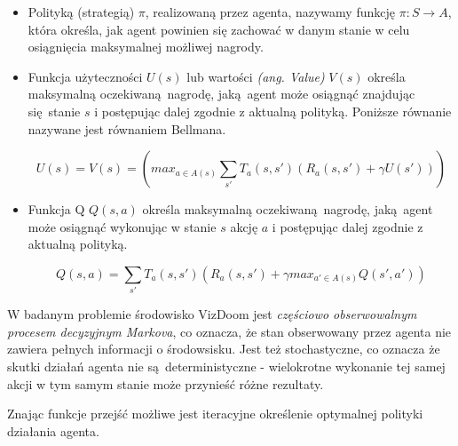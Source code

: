 \begin{itemize}
\item Polityką (strategią) $\pi$, realizowaną przez agenta, nazywamy funkcję $ \pi: S \rightarrow A$, która określa, jak agent powinien się zachować w danym stanie w celu osiągnięcia maksymalnej możliwej nagrody.
\item Funkcja użyteczności $U(s)$ lub wartości \textit{(ang. Value)} $V(s)$ określa maksymalną oczekiwaną nagrodę, jaką agent może osiągnąć znajdując się stanie $s$ i postępując dalej zgodnie z aktualną polityką. Poniższe równanie nazywane jest równaniem Bellmana.

$$U(s) = V(s) = (max_{a \in A(s)} \sum_{s'} T_a(s,s')(R_a(s,s') + \gamma U(s')))$$
\item Funkcja Q $Q(s,a)$ określa maksymalną oczekiwaną nagrodę, jaką agent może osiągnąć wykonując w stanie $s$ akcję $a$ i postępując dalej zgodnie z aktualną polityką.

$$Q(s,a) = \sum_{s'} T_a(s,s')(R_a(s,s') + \gamma max_{a' \in A(s)}Q(s',a'))$$

\end{itemize}

\vspace{5mm}

W badanym problemie środowisko VizDoom jest \textit{częściowo obserwowalnym procesem decyzyjnym Markova}, co oznacza, że stan obserwowany przez agenta nie zawiera pełnych informacji o środowsisku. Jest też stochastyczne, co oznacza że skutki działań agenta nie są deterministyczne - wielokrotne wykonanie tej samej akcji w tym samym stanie może przynieść różne rezultaty.

Znając funkcje przejść możliwe jest iteracyjne określenie optymalnej polityki działania agenta. 



